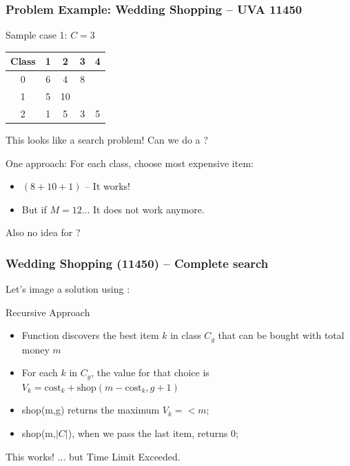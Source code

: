 \documentclass{beamer}
\begin{document}
\begin{frame}
  \frametitle{Problem Example: Wedding Shopping -- UVA 11450}
  \begin{block}{Sample case 1: $C=3$}
  \begin{tabular}{|c|cccc|}
    Class & 1 & 2 & 3 & 4\\
    \hline
    0 & 6 & 4 & 8 & \\
    1 & 5 & 10 & & \\
    2 & 1 & 5 & 3 & 5\\
  \end{tabular}
  \end{block}

  This looks like a search problem! Can we do a ?

  \bigskip

  One approach: For each class, choose most expensive item:\\
  \begin{itemize}
  \item $(8+10+1)$ -- It works!
  \item But if $M = 12$... It does not work anymore.
  \end{itemize}


  \medskip

  Also no idea for ?

\end{frame}

\begin{frame}
  \frametitle{Wedding Shopping (11450) -- Complete search}
  Let's image a solution using :

  {\small
  \begin{block}{Recursive Approach}
    \begin{itemize}
    \item Function  discovers the best item $k$
      in class $C_g$ that can be bought with total money $m$
    \item For each $k$ in $C_g$, the value for that choice is $V_k =
      \text{cost}_k + \text{shop}(m - \text{cost}_k, g+1)$
    \item shop(m,g) returns the maximum $V_k =< m$;
    \item shop(m,$|C|$), when we pass the last item, returns 0;
    \end{itemize}

  \end{block}
  }
  \vfill

  This works! ... but Time Limit Exceeded.
\end{frame}
\end{document}
